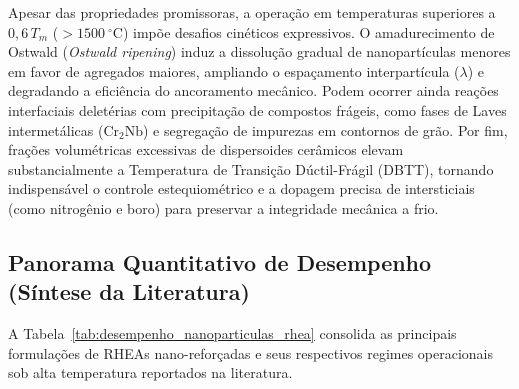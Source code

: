 Apesar das propriedades promissoras, a operação em temperaturas superiores a $0{,}6\,T_m$ ($> 1500~^\circ\mathrm{C}$) impõe desafios cinéticos expressivos. O amadurecimento de Ostwald (\emph{Ostwald ripening}) induz a dissolução gradual de nanopartículas menores em favor de agregados maiores, ampliando o espaçamento interpartícula ($\lambda$) e degradando a eficiência do ancoramento mecânico. Podem ocorrer ainda reações interfaciais deletérias com precipitação de compostos frágeis, como fases de Laves intermetálicas ($\mathrm{Cr}_2\mathrm{Nb}$) e segregação de impurezas em contornos de grão. Por fim, frações volumétricas excessivas de dispersoides cerâmicos elevam substancialmente a Temperatura de Transição Dúctil-Frágil (DBTT), tornando indispensável o controle estequiométrico e a dopagem precisa de intersticiais (como nitrogênio e boro) para preservar a integridade mecânica a frio.

\subsection{Panorama Quantitativo de Desempenho (Síntese da Literatura)}\label{subsec:panorama_quantitativo_desempenho}

A Tabela~\ref{tab:desempenho_nanoparticulas_rhea} consolida as principais formulações de RHEAs nano-reforçadas e seus respectivos regimes operacionais sob alta temperatura reportados na literatura.

